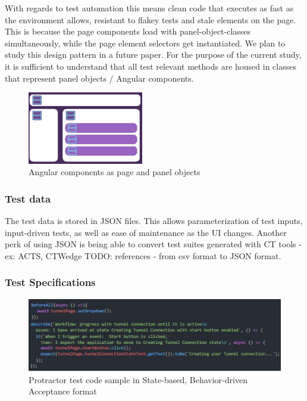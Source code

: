\documentclass[conference]{IEEEtran}
\newcommand{\todo}[1]{}
\renewcommand{\todo}[1]{{\color{red} TODO: {#1}}}
\begin{document}
	With regards to test automation this means clean code that executes as fast as the environment allows, resistant to flakey tests and stale elements on the page. 
	This is because the page components load with panel-object-classes simultaneously, while the page element selectors get instantiated.
	We plan to study this design pattern in a future paper. For the purpose of the current study, it is sufficient to understand that all test relevant methods are housed in classes that represent panel objects / Angular components.
	
	\begin{figure}[!h]
		\includegraphics[width=0.45\textwidth,]{angular.pdf}
	\caption{Angular components as page and panel objects}
	\label{fig:angular}
	\end{figure}

	\subsubsection{Test data}
	The test data is stored in JSON files. This allows parameterization of test inputs, input-driven tests, as well as ease of maintenance as the UI changes.
	Another perk of using JSON is being able to convert test suites generated with CT tools - ex: ACTS, CTWedge \todo{references }- from csv format to JSON format.

	\subsubsection{Test Specifications}

	\begin{figure}[!ht]
		\centering
			\includegraphics[width=1.00\textwidth]{codeSample.pdf}
		\caption{Protractor test code sample in State-based, Behavior-driven Acceptance format}
		\label{fig:codeSample}
	\end{figure}	
\end{document}

